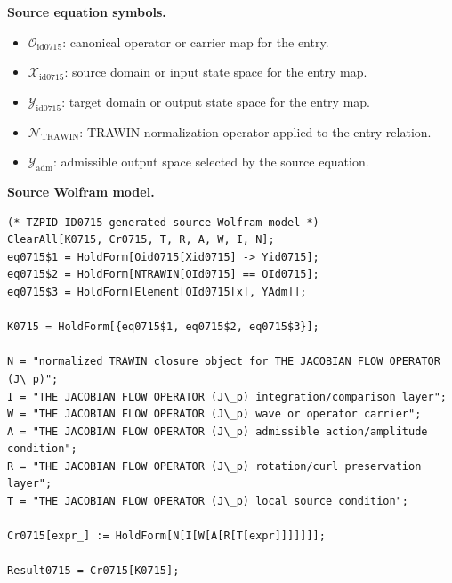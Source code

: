 \begin{minipage}[t]{0.49\linewidth}
\begingroup
\small
\raggedright
\textbf{Source equation symbols.}\par
\begin{itemize}[leftmargin=1.35em,itemsep=1pt,topsep=1pt,parsep=0pt]
    \item $\mathcal{O}_{\mathrm{id0715}}$: canonical operator or carrier map for the entry.
    \item $\mathcal{X}_{\mathrm{id0715}}$: source domain or input state space for the entry map.
    \item $\mathcal{Y}_{\mathrm{id0715}}$: target domain or output state space for the entry map.
    \item $\mathcal{N}_{\mathrm{TRAWIN}}$: TRAWIN normalization operator applied to the entry relation.
    \item $\mathcal{Y}_{\mathrm{adm}}$: admissible output space selected by the source equation.
\end{itemize}
\endgroup
\end{minipage}\hfill
\begin{minipage}[t]{0.47\linewidth}
\begingroup
\scriptsize
\raggedright
\textbf{Source Wolfram model.}\par
\begin{Verbatim}[fontsize=\tiny,breaklines=true,breakanywhere=true]
(* TZPID ID0715 generated source Wolfram model *)
ClearAll[K0715, Cr0715, T, R, A, W, I, N];
eq0715$1 = HoldForm[Oid0715[Xid0715] -> Yid0715];
eq0715$2 = HoldForm[NTRAWIN[OId0715] == OId0715];
eq0715$3 = HoldForm[Element[OId0715[x], YAdm]];

K0715 = HoldForm[{eq0715$1, eq0715$2, eq0715$3}];

N = "normalized TRAWIN closure object for THE JACOBIAN FLOW OPERATOR (J\_p)";
I = "THE JACOBIAN FLOW OPERATOR (J\_p) integration/comparison layer";
W = "THE JACOBIAN FLOW OPERATOR (J\_p) wave or operator carrier";
A = "THE JACOBIAN FLOW OPERATOR (J\_p) admissible action/amplitude condition";
R = "THE JACOBIAN FLOW OPERATOR (J\_p) rotation/curl preservation layer";
T = "THE JACOBIAN FLOW OPERATOR (J\_p) local source condition";

Cr0715[expr_] := HoldForm[N[I[W[A[R[T[expr]]]]]]];

Result0715 = Cr0715[K0715];
\end{Verbatim}
\endgroup
\end{minipage}

